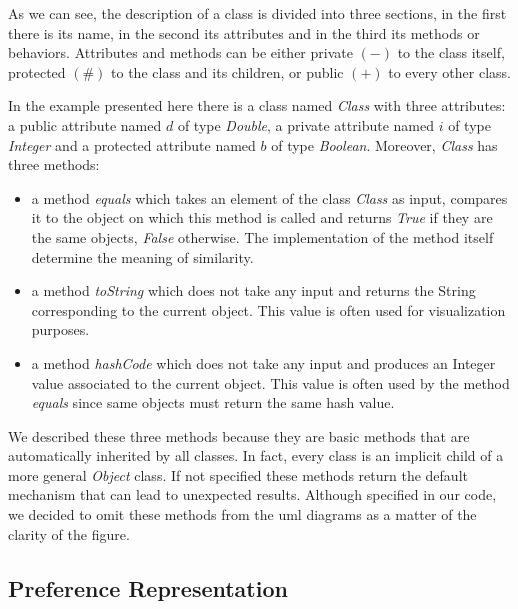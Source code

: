 As we can see, the description of a class is divided into three sections, in the first there is its name, in the second its attributes and in the third its methods or behaviors. Attributes and methods can be either private $(-)$ to the class itself, protected $(\#)$ to the class and its children, or public $(+)$ to every other class.

In the example presented here there is a class named \textit{Class} with three attributes: a public attribute named $d$ of type \textit{Double}, a private attribute named $i$ of type \textit{Integer} and a protected attribute named $b$ of type \textit{Boolean}. Moreover, \textit{Class} has three methods:
\begin{itemize}[noitemsep]
	\item a method \textit{equals} which takes an element of the class \textit{Class} as input, compares it to the object on which this method is called and returns \textit{True} if they are the same objects, \textit{False} otherwise. The implementation of the method itself determine the meaning of similarity.
	\item a method \textit{toString} which does not take any input and returns the String corresponding to the current object. This value is often used for visualization purposes.
	\item a method \textit{hashCode} which does not take any input and produces an Integer value associated to the current object. This value is often used by the method \textit{equals} since same objects must return the same hash value. 
\end{itemize}

We described these three methods because they are basic methods that are automatically inherited by all classes. In fact, every class is an implicit child of a more general \textit{Object} class. If not specified these methods return the default mechanism that can lead to unexpected results. Although specified in our code, we decided to omit these methods from the uml diagrams as a matter of the clarity of the figure.

\subsection{Preference Representation}

